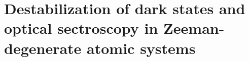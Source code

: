 \section{Destabilization of dark states and optical sectroscopy in Zeeman-degenerate atomic systems} %
\label{sec:destabilization_of_dark_states_and_optical_sectroscopy_in_zeeman_degenerate_atomic_systems}
